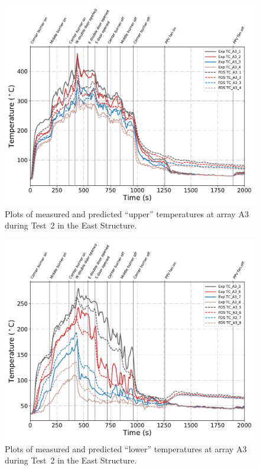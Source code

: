 \clearpage
\begin{figure}[p]
	\centering
	\includegraphics[width=\columnwidth]{Figures/Plots/Validation/Temperature/Test_2_TC_A3_upper}
	\caption{Plots of measured and predicted ``upper'' temperatures at array A3 during Test~2 in the East Structure.}
	\label{fig:TCA3_upper_data_Test2}
\end{figure}
\begin{figure}[p]
	\centering
	\includegraphics[width=\columnwidth]{Figures/Plots/Validation/Temperature/Test_2_TC_A3_lower}
	\caption{Plots of measured and predicted ``lower'' temperatures at array A3 during Test~2 in the East Structure.}
	\label{fig:TCA3_lower_data_Test2}
\end{figure}

